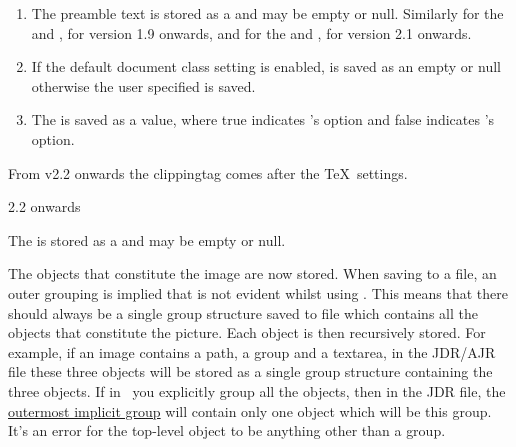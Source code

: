 \begin{numbered}
\begin{enumerate}
\item The preamble text  is stored as a 
and may be empty or null. Similarly for the 
and , for version 1.9 onwards, and for the
 and , for version 2.1 onwards.

\item If the default document class setting is enabled,  is saved as an empty or null  otherwise the user
specified  is saved.

\item The  is saved as a  value,
where true indicates 's 
option and false indicates 's
 option.
\end{enumerate}

\item\label{jdr:cliptag}From v2.2 onwards the \gls{clippingtag} comes
after the \TeX\ settings.
\begin{jdrversion}{2.2 onwards}
\begin{syntaxline}
\end{syntaxline}
\end{jdrversion}
The  is stored as a  and may be empty or
null.

\item\label{jdr:object} The \glspl{object} that constitute the
image are now stored.  When saving to a file, an outer grouping is
implied that is not evident whilst using \FlowframTk. This means that
there should always be a single group structure saved to file which
contains all the \glspl{object} that
constitute the picture. Each \gls{object} is then recursively
stored. For example, if an image contains a \gls{path}, a
\gls{group} and a \gls{textarea}, in the
\gls{JDR}/\gls{AJR} file these three objects will be stored as a single
group structure containing the three objects. If in \FlowframTk\ you
explicitly \gls{group} all the objects, then in the
\gls{JDR} file, the \hyperref[jdr:object]{outermost implicit group} will contain
only one \gls{object} which will be this \gls{group}. It's an error
for the top-level object to be anything other than a \gls{group}.


\end{numbered}
